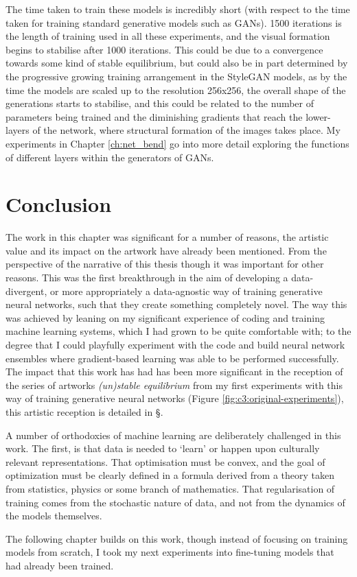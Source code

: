 The time taken to train these models is incredibly short (with respect to the time taken for training standard generative models such as GANs). 
1500 iterations is the length of training used in all these experiments, and the visual formation begins to stabilise after 1000 iterations. 
This could be due to a convergence towards some kind of stable equilibrium, but could also be in part determined by the progressive growing training arrangement in the StyleGAN models, as by the time the models are scaled up to the resolution 256x256, the overall shape of the generations starts to stabilise, and this could be related to the number of parameters being trained and the diminishing gradients that reach the lower-layers of the network, where structural formation of the images takes place.
My experiments in Chapter \ref{ch:net_bend} go into more detail exploring the functions of different layers within the generators of GANs. 


\section{Conclusion}

The work in this chapter was significant for a number of reasons, the artistic value and its impact on the artwork have already been mentioned. 
From the perspective of the narrative of this thesis though it was important for other reasons. 
This was the first breakthrough in the aim of developing a data-divergent, or more appropriately a data-agnostic way of training generative neural networks, such that they create something completely novel. 
The way this was achieved by leaning on my significant experience of coding and training machine learning systems, which I had grown to be quite comfortable with; to the degree that I could playfully experiment with the code and build neural network ensembles where gradient-based learning was able to be performed successfully.
The impact that this work has had has been more significant in the reception of the series of artworks \textit{(un)stable equilibrium} from my first experiments with this way of training generative neural networks (Figure \ref{fig:c3:original-experiments}), this artistic reception is detailed in \S \label{c7:sec:unstable_eq}.

A number of orthodoxies of machine learning are deliberately challenged in this work. 
The first, is that data is needed to ‘learn’ or happen upon culturally relevant representations. That optimisation must be convex, and the goal of optimization must be clearly defined in a formula derived from a theory taken from statistics, physics or some branch of mathematics. 
That regularisation of training comes from the stochastic nature of data, and not from the dynamics of the models themselves. 

The following chapter builds on this work, though instead of focusing on training models from scratch, I took my next experiments into fine-tuning models that had already been trained.
